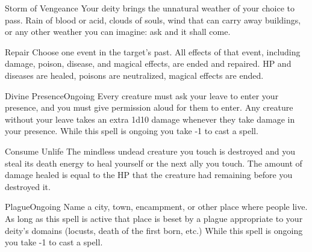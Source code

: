 \documentclass[8pt]{extarticle}
\begin{document}
\begin{multicols}{2}
\begin{aspell}{Storm of Vengeance}{}
  Your deity brings the unnatural weather of your choice to pass. Rain
  of blood or acid, clouds of souls, wind that can carry away
  buildings, or any other weather you can imagine: ask and it shall
  come.
\end{aspell}

\begin{aspell}{Repair}{}
  Choose one event in the target’s past. All effects of that event,
  including damage, poison, disease, and magical effects, are ended
  and repaired. HP and diseases are healed, poisons are neutralized,
  magical effects are ended.
\end{aspell}

\begin{aspell}{Divine Presence}{Ongoing}
  Every creature must ask your leave to enter your presence, and you
  must give permission aloud for them to enter. Any creature without
  your leave takes an extra 1d10 damage whenever they take damage in
  your presence. While this spell is ongoing you take -1 to cast a
  spell.
\end{aspell}

\vfill\null
\columnbreak

\begin{aspell}{Consume Unlife}{}
  The mindless undead creature you touch is destroyed and you steal
  its death energy to heal yourself or the next ally you touch. The
  amount of damage healed is equal to the HP that the creature had
  remaining before you destroyed it.
\end{aspell}

\begin{aspell}{Plague}{Ongoing}
  Name a city, town, encampment, or other place where people live. As
  long as this spell is active that place is beset by a plague
  appropriate to your deity’s domains (locusts, death of the first
  born, etc.) While this spell is ongoing you take -1 to cast a spell.
\end{aspell}
\vfill\null
\end{multicols}
\end{document}
